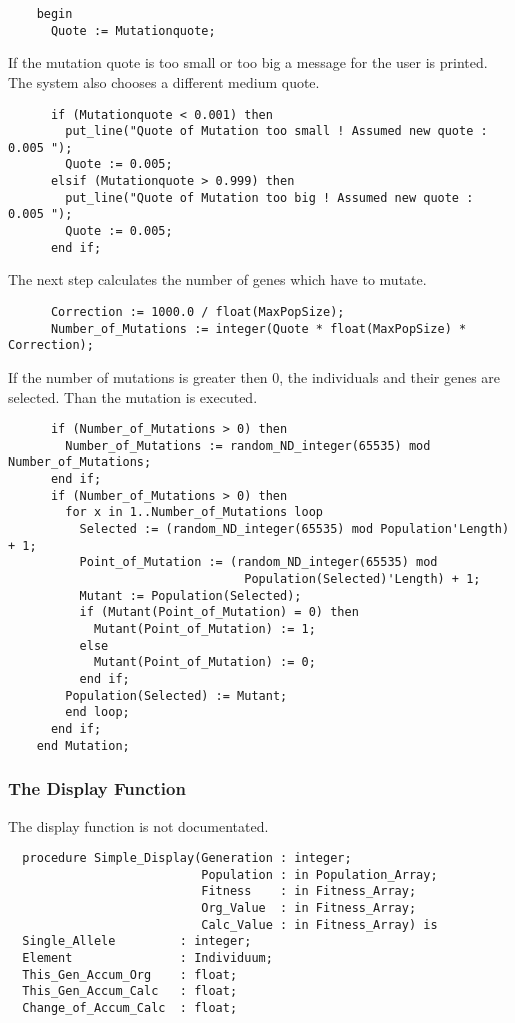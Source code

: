 \begin{enumerate}
\begin{verbatim}
    begin
      Quote := Mutationquote;
\end{verbatim}
If the mutation quote is too small or too big a message for the user is printed.
The system also chooses a different medium quote.
\begin{verbatim}
      if (Mutationquote < 0.001) then
        put_line("Quote of Mutation too small ! Assumed new quote : 0.005 ");
        Quote := 0.005;
      elsif (Mutationquote > 0.999) then
        put_line("Quote of Mutation too big ! Assumed new quote : 0.005 ");
        Quote := 0.005;
      end if;
\end{verbatim}
The next step calculates the number of genes which have to mutate.
\begin{verbatim}
      Correction := 1000.0 / float(MaxPopSize);
      Number_of_Mutations := integer(Quote * float(MaxPopSize) * Correction);
\end{verbatim}
If the number of mutations is greater then 0, the individuals and their genes
are selected. Than the mutation is executed.
\begin{verbatim}
      if (Number_of_Mutations > 0) then
        Number_of_Mutations := random_ND_integer(65535) mod Number_of_Mutations;
      end if;
      if (Number_of_Mutations > 0) then
        for x in 1..Number_of_Mutations loop
          Selected := (random_ND_integer(65535) mod Population'Length) + 1;
          Point_of_Mutation := (random_ND_integer(65535) mod
                                 Population(Selected)'Length) + 1;
          Mutant := Population(Selected);
          if (Mutant(Point_of_Mutation) = 0) then
            Mutant(Point_of_Mutation) := 1;
          else
            Mutant(Point_of_Mutation) := 0;
          end if;
        Population(Selected) := Mutant;
        end loop;
      end if;
    end Mutation;
\end{verbatim}
\subsubsection{The Display Function}
The display function is not documentated.
\begin{verbatim}
  procedure Simple_Display(Generation : integer;
                           Population : in Population_Array;
                           Fitness    : in Fitness_Array;
                           Org_Value  : in Fitness_Array;
                           Calc_Value : in Fitness_Array) is
  Single_Allele         : integer;
  Element               : Individuum;
  This_Gen_Accum_Org    : float;
  This_Gen_Accum_Calc   : float;
  Change_of_Accum_Calc  : float;


\end{verbatim}
\end{enumerate}
